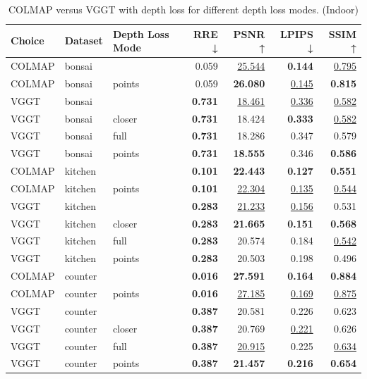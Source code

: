 \begin{table}[H]
\caption{\ifdefined\customcaption \customcaption \else COLMAP versus VGGT with depth loss for different depth loss modes. (Indoor) \fi}
\label{tab:05_depth_loss_mode_indoor}
\centering
\scriptsize
\begin{tabular}{lllrrrr}
\toprule
Choice & Dataset & Depth Loss Mode & RRE ↓ & PSNR ↑ & LPIPS ↓ & SSIM ↑ \\
\midrule
COLMAP & bonsai &  & 0.059 & \underline{25.544} & \textbf{0.144} & \underline{0.795} \\
COLMAP & bonsai & points & 0.059 & \textbf{26.080} & \underline{0.145} & \textbf{0.815} \\
\midrule
VGGT & bonsai &  & \textbf{0.731} & \underline{18.461} & \underline{0.336} & \underline{0.582} \\
VGGT & bonsai & closer & \textbf{0.731} & 18.424 & \textbf{0.333} & \underline{0.582} \\
VGGT & bonsai & full & \textbf{0.731} & 18.286 & 0.347 & 0.579 \\
VGGT & bonsai & points & \textbf{0.731} & \textbf{18.555} & 0.346 & \textbf{0.586} \\
\midrule
COLMAP & kitchen &  & \textbf{0.101} & \textbf{22.443} & \textbf{0.127} & \textbf{0.551} \\
COLMAP & kitchen & points & \textbf{0.101} & \underline{22.304} & \underline{0.135} & \underline{0.544} \\
\midrule
VGGT & kitchen &  & \textbf{0.283} & \underline{21.233} & \underline{0.156} & 0.531 \\
VGGT & kitchen & closer & \textbf{0.283} & \textbf{21.665} & \textbf{0.151} & \textbf{0.568} \\
VGGT & kitchen & full & \textbf{0.283} & 20.574 & 0.184 & \underline{0.542} \\
VGGT & kitchen & points & \textbf{0.283} & 20.503 & 0.198 & 0.496 \\
\midrule
COLMAP & counter &  & \textbf{0.016} & \textbf{27.591} & \textbf{0.164} & \textbf{0.884} \\
COLMAP & counter & points & \textbf{0.016} & \underline{27.185} & \underline{0.169} & \underline{0.875} \\
\midrule
VGGT & counter &  & \textbf{0.387} & 20.581 & 0.226 & 0.623 \\
VGGT & counter & closer & \textbf{0.387} & 20.769 & \underline{0.221} & 0.626 \\
VGGT & counter & full & \textbf{0.387} & \underline{20.915} & 0.225 & \underline{0.634} \\
VGGT & counter & points & \textbf{0.387} & \textbf{21.457} & \textbf{0.216} & \textbf{0.654} \\
\bottomrule
\end{tabular}
\end{table}